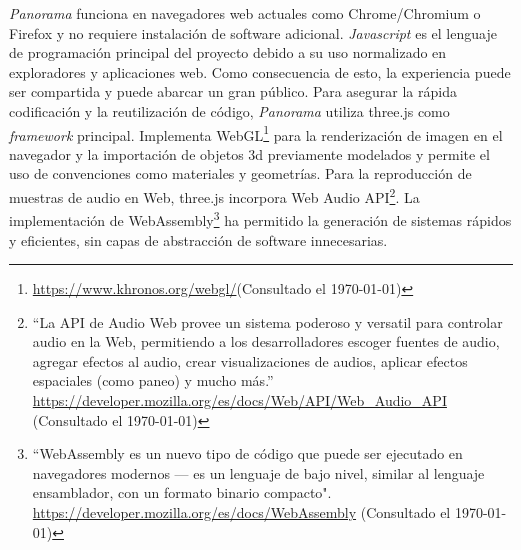 
\textit{Panorama} funciona en navegadores web actuales como Chrome/Chromium o Firefox y no requiere instalación de software adicional. \textit{Javascript} es el lenguaje de programación principal del proyecto debido a su uso normalizado en exploradores y aplicaciones web. Como consecuencia de esto, la experiencia puede ser compartida y puede abarcar un gran público. Para asegurar la rápida codificación y la reutilización de código, \textit{Panorama} utiliza three.js como \textit{framework} principal. Implementa WebGL\footnote{\url{https://www.khronos.org/webgl/}(Consultado el \today)} para la renderización de imagen en el navegador y la importación de objetos 3d previamente modelados y permite el uso de convenciones como materiales y geometrías. Para la reproducción de muestras de audio en Web, three.js incorpora Web Audio API\footnote{``La API de Audio Web provee un sistema poderoso y versatil para controlar audio en la Web, permitiendo a los desarrolladores escoger fuentes de audio, agregar efectos al audio, crear visualizaciones de audios, aplicar efectos espaciales (como paneo) y mucho más.'' \url{https://developer.mozilla.org/es/docs/Web/API/Web_Audio_API} (Consultado el \today)}. La implementación de WebAssembly\footnote{``WebAssembly es un nuevo tipo de código que puede ser ejecutado en navegadores modernos — es un lenguaje de bajo nivel, similar al lenguaje ensamblador, con un formato binario compacto". \url{https://developer.mozilla.org/es/docs/WebAssembly} (Consultado el \today) } ha permitido la generación de sistemas rápidos y eficientes, sin capas de abstracción de software innecesarias. %


  
